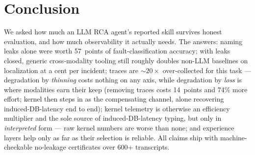 \section{Conclusion}
\label{sec:conclusion}

We asked how much an LLM RCA agent's reported skill survives honest evaluation, and
how much observability it actually needs. The answers: naming leaks alone were worth
57~points of fault-classification accuracy; with leaks closed, generic cross-modality
tooling still roughly doubles non-LLM baselines on localization at a cent per
incident; traces are ${\sim}20\times$ over-collected for this task --- degradation by
\emph{thinning} costs nothing on any axis, while degradation by \emph{loss} is where
modalities earn their keep (removing traces costs 14~points and 74\% more effort;
kernel then steps in as the compensating channel, alone recovering induced-DB-latency
end to end); kernel telemetry is otherwise an efficiency multiplier and the sole
source of induced-DB-latency typing, but only in \emph{interpreted} form --- raw
kernel numbers are worse than none; and experience layers help only as far as their
selection is reliable. All claims ship with machine-checkable no-leakage certificates
over 600+ transcripts.


